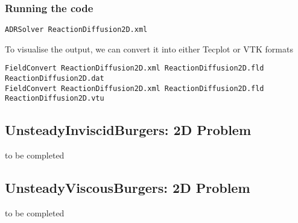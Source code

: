 \subsubsection{Running the code}
\begin{lstlisting}[style=BashInputStyle]
ADRSolver ReactionDiffusion2D.xml
\end{lstlisting}

To visualise the output, we can convert it into either Tecplot or VTK formats
\begin{lstlisting}[style=BashInputStyle]
FieldConvert ReactionDiffusion2D.xml ReactionDiffusion2D.fld ReactionDiffusion2D.dat
FieldConvert ReactionDiffusion2D.xml ReactionDiffusion2D.fld ReactionDiffusion2D.vtu
\end{lstlisting}


\subsection{UnsteadyInviscidBurgers: 2D Problem}
to be completed


\subsection{UnsteadyViscousBurgers: 2D Problem}
to be completed

